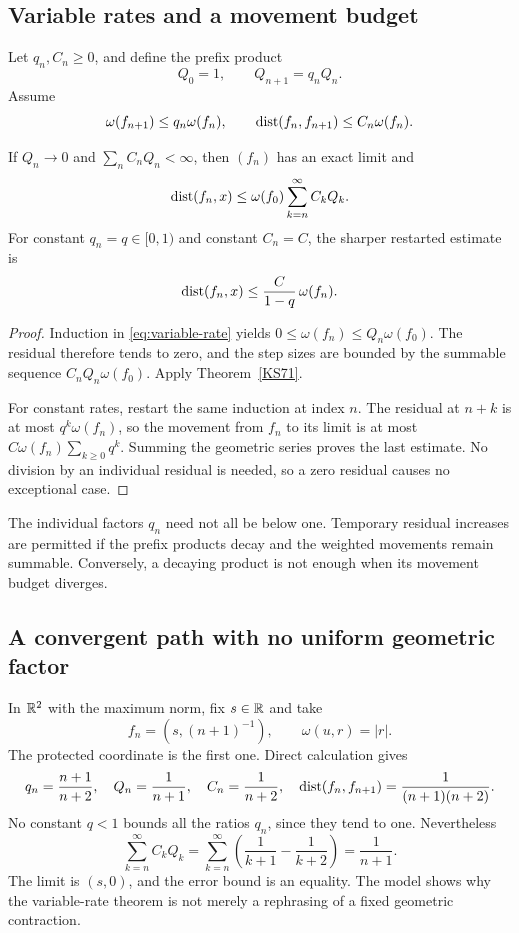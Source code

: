\subsection{Variable rates and a movement budget}
Let \(q_n,C_n\ge0\), and define the prefix product
\[
 Q_0=1,\qquad Q_{n+1}=q_nQ_n.
\]
Assume
\begin{equation}\label{eq:variable-rate}
 \omega(f_{n+1})\le q_n\omega(f_n),\qquad
 \operatorname{dist}(f_n,f_{n+1})\le C_n\omega(f_n).
\end{equation}

\begin{theorem}\label{KS72}
If \(Q_n\to0\) and \(\sum_n C_nQ_n<\infty\), then \((f_n)\) has an exact limit and
\begin{equation}\label{eq:variable-tail}
 \operatorname{dist}(f_n,x)\le\omega(f_0)\sum_{k=n}^{\infty}C_kQ_k.
\end{equation}
For constant \(q_n=q\in[0,1)\) and constant \(C_n=C\), the sharper restarted estimate is
\[
 \operatorname{dist}(f_n,x)\le\frac{C}{1-q}\,\omega(f_n).
\]
\end{theorem}
\begin{proof}
Induction in \eqref{eq:variable-rate} yields \(0\le\omega(f_n)\le Q_n\omega(f_0)\). The residual therefore tends to zero, and the step sizes are bounded by the summable sequence \(C_nQ_n\omega(f_0)\). Apply Theorem~\ref{KS71}.

For constant rates, restart the same induction at index \(n\). The residual at \(n+k\) is at most \(q^k\omega(f_n)\), so the movement from \(f_n\) to its limit is at most \(C\omega(f_n)\sum_{k\ge0}q^k\). Summing the geometric series proves the last estimate. No division by an individual residual is needed, so a zero residual causes no exceptional case.
\end{proof}
The individual factors \(q_n\) need not all be below one. Temporary residual increases are permitted if the prefix products decay and the weighted movements remain summable. Conversely, a decaying product is not enough when its movement budget diverges.

\subsection{A convergent path with no uniform geometric factor}
In \(\mathbb R^2\) with the maximum norm, fix \(s\in\mathbb R\) and take
\[
 f_n=(s,(n+1)^{-1}),\qquad \omega(u,r)=|r|.
\]
The protected coordinate is the first one. Direct calculation gives
\[
 q_n=\frac{n+1}{n+2},\quad Q_n=\frac1{n+1},\quad
 C_n=\frac1{n+2},\quad
 \operatorname{dist}(f_n,f_{n+1})=\frac1{(n+1)(n+2)}.
\]
No constant \(q<1\) bounds all the ratios \(q_n\), since they tend to one. Nevertheless
\[
 \sum_{k=n}^{\infty}C_kQ_k
 =\sum_{k=n}^{\infty}\left(\frac1{k+1}-\frac1{k+2}\right)
 =\frac1{n+1}.
\]
The limit is \((s,0)\), and the error bound is an equality. The model shows why the variable-rate theorem is not merely a rephrasing of a fixed geometric contraction.

